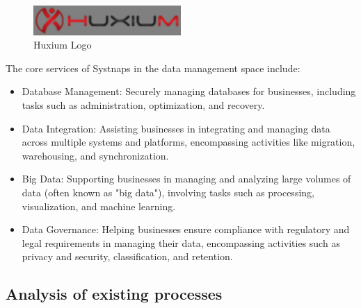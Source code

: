 \begin{figure}[!ht]\centering
\includegraphics[width=0.5\textwidth,angle=00]{assets/fb.png}
\caption{Huxium Logo}
\end{figure} 
\newpage
\hspace{7mm}The core services of Systnaps in the data management space include: 
\begin{itemize}[label={--}]
    \item Database Management: Securely managing databases for businesses, including tasks such as administration, optimization, and recovery. 

\item Data Integration: Assisting businesses in integrating and managing data across multiple systems and platforms, encompassing activities like migration, warehousing, and synchronization. 

\item Big Data: Supporting businesses in managing and analyzing large volumes of data (often known as "big data"), involving tasks such as processing, visualization, and machine learning. 

\item  Data Governance: Helping businesses ensure compliance with regulatory and legal requirements in managing their data, encompassing activities such as privacy and security, classification, and retention. 

 \end{itemize}
 
\subsection{Analysis of existing processes }


